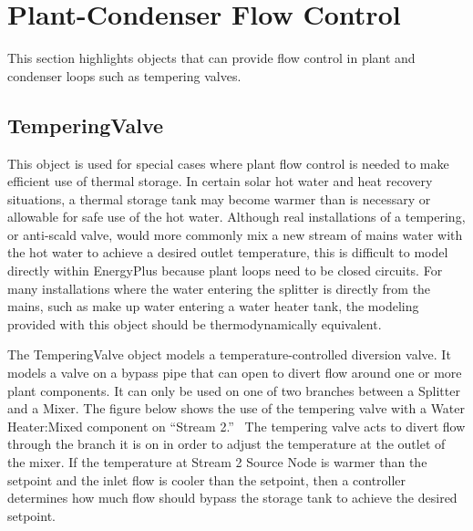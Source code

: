 \section{Plant-Condenser Flow Control}\label{plant-condenser-flow-control}

This section highlights objects that can provide flow control in plant and condenser loops such as tempering valves.

\subsection{TemperingValve}\label{temperingvalve}

This object is used for special cases where plant flow control is needed to make efficient use of thermal storage. In certain solar hot water and heat recovery situations, a thermal storage tank may become warmer than is necessary or allowable for safe use of the hot water. Although real installations of a tempering, or anti-scald valve, would more commonly mix a new stream of mains water with the hot water to achieve a desired outlet temperature, this is difficult to model directly within EnergyPlus because plant loops need to be closed circuits. For many installations where the water entering the splitter is directly from the mains, such as make up water entering a water heater tank, the modeling provided with this object should be thermodynamically equivalent.

The TemperingValve object models a temperature-controlled diversion valve. It models a valve on a bypass pipe that can open to divert flow around one or more plant components. It can only be used on one of two branches between a Splitter and a Mixer. The figure below shows the use of the tempering valve with a Water Heater:Mixed component on ``Stream 2.''~ The tempering valve acts to divert flow through the branch it is on in order to adjust the temperature at the outlet of the mixer. If the temperature at Stream 2 Source Node is warmer than the setpoint and the inlet flow is cooler than the setpoint, then a controller determines how much flow should bypass the storage tank to achieve the desired setpoint.

